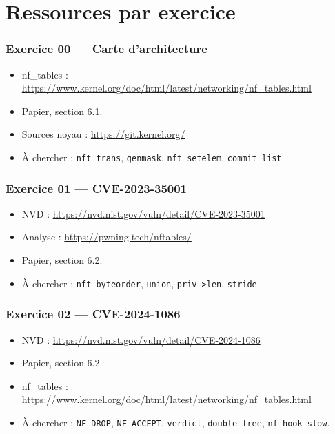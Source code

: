 \documentclass{training}
\begin{document}
\chapter{Ressources par exercice}

\subsection*{Exercice 00 --- Carte d'architecture}
\begin{itemize}
  \item nf\_tables :
        \url{https://www.kernel.org/doc/html/latest/networking/nf_tables.html}
  \item Papier, section 6.1.
  \item Sources noyau : \url{https://git.kernel.org/}
  \item À chercher : \texttt{nft\_trans}, \texttt{genmask},
        \texttt{nft\_setelem}, \texttt{commit\_list}.
\end{itemize}

\subsection*{Exercice 01 --- CVE-2023-35001}
\begin{itemize}
  \item NVD : \url{https://nvd.nist.gov/vuln/detail/CVE-2023-35001}
  \item Analyse : \url{https://pwning.tech/nftables/}
  \item Papier, section 6.2.
  \item À chercher : \texttt{nft\_byteorder}, \texttt{union},
        \texttt{priv->len}, \texttt{stride}.
\end{itemize}

\subsection*{Exercice 02 --- CVE-2024-1086}
\begin{itemize}
  \item NVD : \url{https://nvd.nist.gov/vuln/detail/CVE-2024-1086}
  \item Papier, section 6.2.
  \item nf\_tables :
        \url{https://www.kernel.org/doc/html/latest/networking/nf_tables.html}
  \item À chercher : \texttt{NF\_DROP}, \texttt{NF\_ACCEPT},
        \texttt{verdict}, \texttt{double free}, \texttt{nf\_hook\_slow}.
\end{itemize}
\end{document}
